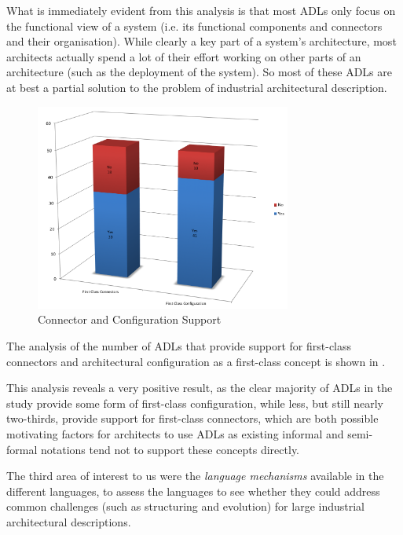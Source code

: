 What is immediately evident from this analysis is that most ADLs only focus on the functional view of a system (i.e. its functional components and connectors and their organisation).  While clearly a key part of a system's architecture, most architects actually spend a lot of their effort working on other parts of an architecture (such as the deployment of the system).  So most of these ADLs are at best a partial solution to the problem of industrial architectural description.

\begin{figure}
\centering
\includegraphics[width=0.75\textwidth]{Figures/litreview-adl-candc}
\caption{Connector and Configuration Support}
\label{figure:litreview-adl-candc}
\end{figure}

The analysis of the number of ADLs that provide support for first-class connectors and architectural configuration as a first-class concept is shown in .

This analysis reveals a very positive result, as the clear majority of ADLs in the study provide some form of first-class configuration, while less, but still nearly two-thirds, provide support for first-class connectors, which are both possible motivating factors for architects to use ADLs as existing informal and semi-formal notations tend not to support these concepts directly.

The third area of interest to us were the \emph{language mechanisms} available in the different languages, to assess the languages to see whether they could address common challenges (such as structuring and evolution) for large industrial architectural descriptions.

